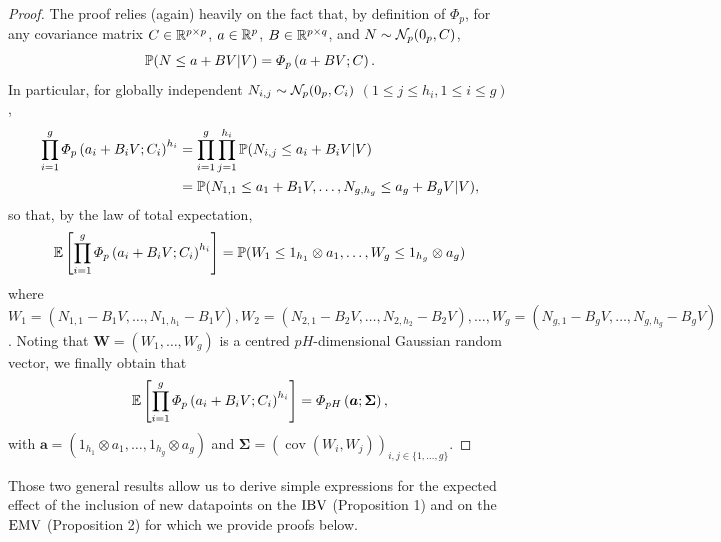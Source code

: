 \documentclass[aoas]{imsart}
\begin{document}
\begin{proof}
    The proof relies (again) heavily on the fact that, by definition of $\Phi_{p}$, for any covariance matrix $C \in \mathbb{R}^{p \times p}$, $a\in \mathbb{R}^p$, $B\in \mathbb{R}^{p \times q}$, and $N\sim \mathcal{N}_{p}(0_{p},C)$,
    $$
    \mathbb{P}(N\leq a + BV | V)
    =
    \varPhi_{p}\left( a + BV; C \right).
    $$
In particular, for globally independent $N_{i,j} \sim \mathcal{N}_{p}(0_{p},C_i)$ $(1\leq j \leq h_i, 1\leq i \leq g)$,
\begin{equation*}
\begin{split}
\prod_{i=1}^{g} \varPhi_{p}\left(a_i + B_{i}V; \covN_{i} \right)^{h_i}
&=
\prod_{i=1}^{g}
\prod_{j=1}^{h_{i}}
\mathbb{P}(N_{i,j}\leq a_i + B_i V | V)\\
&=\mathbb{P}(N_{1,1}\leq a_1 + B_1 V, \dots, N_{g,h_{g}}\leq a_g + B_g V | V),
\end{split} 
\end{equation*}
so that, by the law of total expectation,
    \begin{equation*}
    \begin{split}
    \mathbb{E}\left[ \prod_{i=1}^{g} \varPhi_{p}\left(a_i + B_{i}V; \covN_{i} \right)^{h_i} \right]
=
\mathbb{P}(W_{1} \leq 1_{h_{1}} \otimes a_1, \dots, W_{g} \leq 1_{h_{g}} \otimes a_g)
    \end{split}
    \end{equation*}
where
$W_{1}=(N_{1,1}- B_1 V, \dots, N_{1,h_{1}}- B_1 V), 
W_{2}=(N_{2,1}- B_2 V, \dots, N_{2,h_{2}}- B_2 V), 
\dots, W_{g}=(N_{g,1}- B_g V, \dots, N_{g,h_{g}}- B_g V)$. Noting that $\mathbf{W}=(W_1,\dots, W_g)$ is a centred $p H$-dimensional Gaussian random vector, we finally obtain that
    \begin{equation*}
\begin{split}
\mathbb{E}\left[ \prod_{i=1}^{g} \varPhi_{p}\left(a_i + B_{i}V; \covN_{i} \right)^{h_i} \right]
=
\varPhi_{p H}\left(\bm{a};\mathbf{\Sigma}\right),
    \end{split}
\end{equation*}
with $\bm{a}=(1_{h_{1}} \otimes a_1, \dots, 1_{h_{g}} \otimes a_g)$ and $\bm{\Sigma}=(\operatorname{cov}(W_i,W_j))_{i,j \in \{1,\dots, g\}}$.
\end{proof}

Those two general results allow us to derive simple expressions for the expected effect of the inclusion of new datapoints on the $\operatorname{IBV}$ (Proposition 1) and on the $\operatorname{EMV}$ (Proposition 2) for which we provide proofs below.
\end{document}
